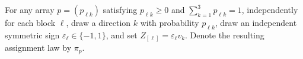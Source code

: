For any array \(p=(p_{\ell k})\) satisfying \(p_{\ell k}\ge0\) and \(\sum_{k=1}^3p_{\ell k}=1\), independently for each block \(\ell\), draw a direction \(k\) with probability \(p_{\ell k}\), draw an independent symmetric sign \(\varepsilon_\ell\in\{-1,1\}\), and set \(Z_{[\ell]}=\varepsilon_\ell v_k\). Denote the resulting assignment law by \(\pi_p\).